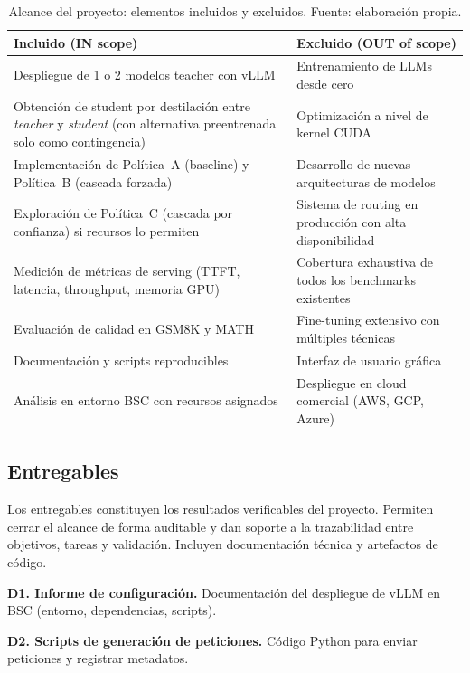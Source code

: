 \documentclass[11pt,a4paper]{article}
\begin{document}
\begin{table}[H]
\centering
\caption{Alcance del proyecto: elementos incluidos y excluidos. Fuente: elaboración propia.}
\label{tab:scope}
\small
\begin{tabular}{>{\raggedright\arraybackslash}p{6.5cm} >{\raggedright\arraybackslash}p{6.5cm}}
\toprule
\textbf{Incluido (IN scope)} & \textbf{Excluido (OUT of scope)} \\
\midrule
Despliegue de 1 o 2 modelos teacher con vLLM & Entrenamiento de LLMs desde cero \\
\addlinespace
Obtención de student por destilación entre \textit{teacher} y \textit{student} (con alternativa preentrenada solo como contingencia) & Optimización a nivel de kernel CUDA \\
\addlinespace
Implementación de Política~A (baseline) y Política~B (cascada forzada) & Desarrollo de nuevas arquitecturas de modelos \\
\addlinespace
Exploración de Política~C (cascada por confianza) si recursos lo permiten & Sistema de routing en producción con alta disponibilidad \\
\addlinespace
Medición de métricas de serving (TTFT, latencia, throughput, memoria GPU) & Cobertura exhaustiva de todos los benchmarks existentes \\
\addlinespace
Evaluación de calidad en GSM8K y MATH & Fine-tuning extensivo con múltiples técnicas \\
\addlinespace
Documentación y scripts reproducibles & Interfaz de usuario gráfica \\
\addlinespace
Análisis en entorno BSC con recursos asignados & Despliegue en cloud comercial (AWS, GCP, Azure) \\
\bottomrule
\end{tabular}
\end{table}

\subsection{Entregables}

Los entregables constituyen los resultados verificables del proyecto. Permiten cerrar el alcance de forma auditable y dan soporte a la trazabilidad entre objetivos, tareas y validación. Incluyen documentación técnica y artefactos de código.

\textbf{D1. Informe de configuración.} Documentación del despliegue de vLLM en BSC (entorno, dependencias, scripts).

\textbf{D2. Scripts de generación de peticiones.} Código Python para enviar peticiones y registrar metadatos.
\end{document}
